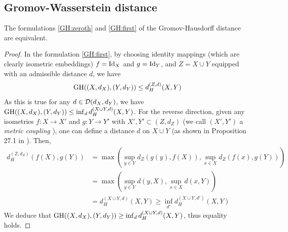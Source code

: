 \subsection{Gromov-Wasserstein distance}

\begin{corollary}
    The formulations \eqref{GH:zeroth} and \eqref{GH:first} of the Gromov-Hausdorff distance
    are equivalent.
\end{corollary}
\begin{proof}
In the formulation \eqref{GH:first}, by choosing identity mappings (which are clearly isometric embeddings)
$f = \text{Id}_X$ and $g = \text{Id}_Y$, and $Z = X \cup Y$ equipped with an admissible distance $d$, we have
\begin{equation}
  \text{GH}((X,d_X), (Y,d_Y)) \leq d_{H}^{(Z,d)}(X, Y)
\end{equation}
As this is true for any $d \in \mathcal D(d_X,d_Y)$, we have
$\text{GH}((X,d_X), (Y,d_Y)) \leq \inf_{d} d_{H}^{(X \cup Y, d)}(X, Y)$. For the reverse direction,
given any isometries $f: X \to X'$ and $g: Y \to Y'$ with $X', Y' \subset (Z, d_Z)$
(we call $(X',Y')$ a \textit{metric coupling} \citep{Villani08}), one can define
a distance $d$ on $X \cup Y$ (as shown in Proposition 27.1 in \citep{Villani08}). Then,
\begin{equation}
  \begin{split}
    d_H^{(Z, d_Z)}(f(X), g(Y)) &=
  \max(\sup_{y \in Y} d_Z(g(y), f(X)), \sup_{x \in X} d_Z(f(x), g(Y))) \\
  &= \max(\sup_{y \in Y} d(y, X), \sup_{x \in X} d(x, Y)) \\
  &= d_H^{(X \cup Y, d)}(X, Y) \geq \inf_{d'} d_{H}^{(X \cup Y, d')}(X, Y)
  \end{split}
\end{equation}
We deduce that $\text{GH}((X,d_X), (Y,d_Y)) \geq \inf_{d} d_{H}^{(X \cup Y, d)}(X, Y)$,
thus equality holds.
\end{proof}

